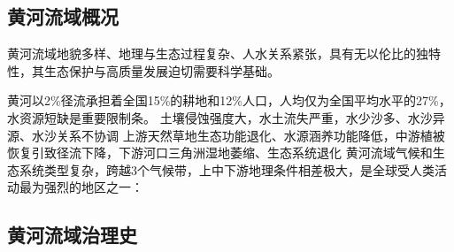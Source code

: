 
\subsection{黄河流域概况}

黄河流域地貌多样、地理与生态过程复杂、人水关系紧张，具有无以伦比的独特性，其生态保护与高质量发展迫切需要科学基础。

黄河以2\%径流承担着全国15\%的耕地和12\%人口，人均仅为全国平均水平的27\%，水资源短缺是重要限制条。
土壤侵蚀强度大，水土流失严重，水少沙多、水沙异源、水沙关系不协调
上游天然草地生态功能退化、水源涵养功能降低，中游植被恢复引致径流下降，下游河口三角洲湿地萎缩、生态系统退化
黄河流域气候和生态系统类型复杂，跨越3个气候带，上中下游地理条件相差极大，是全球受人类活动最为强烈的地区之一：

\subsection{黄河流域治理史}
